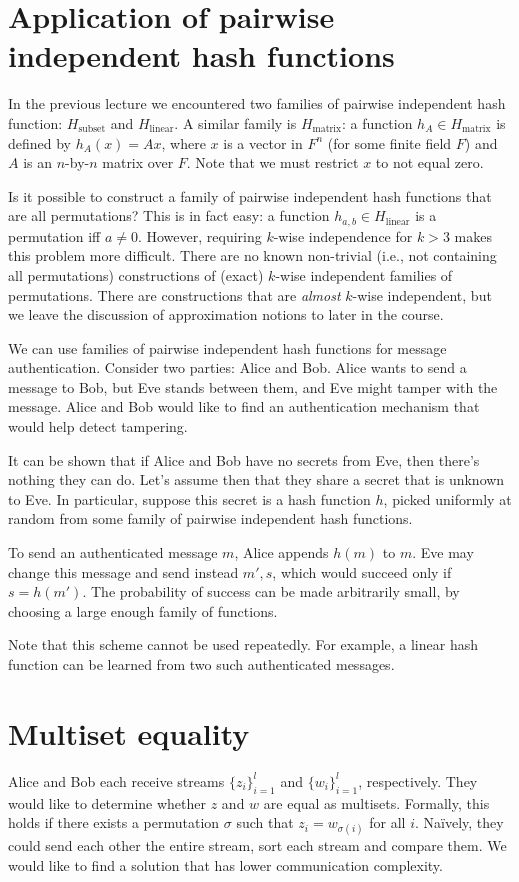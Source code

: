 \documentclass{article}
\begin{document}
\section{Application of pairwise independent hash functions}
In the previous lecture we encountered two families of pairwise
independent hash function: $H_{\mathrm{subset}}$ and
$H_{\mathrm{linear}}$. A similar family is $H_{\mathrm{matrix}}$: a
function $h_A \in H_{\mathrm{matrix}}$ is defined by $h_A(x) = Ax$,
where $x$ is a vector in $F^n$ (for some finite field $F$) and
$A$ is an $n$-by-$n$ matrix over $F$. Note that we must restrict $x$
to not equal zero.

Is it possible to construct a family of pairwise independent hash
functions that are all permutations? This is in fact easy: a function
$h_{a,b} \in H_{\mathrm{linear}}$ is a permutation iff $a \neq 0$.
However, requiring $k$-wise independence for $k>3$ makes this problem
more difficult. There are no known non-trivial (i.e., not containing
all permutations) constructions of (exact) $k$-wise independent
families of permutations.  There are constructions that are {\em
  almost} $k$-wise independent, but we leave the discussion of
approximation notions to later in the course.

We can use families of pairwise independent hash functions for message
authentication. Consider two parties: Alice and Bob. Alice wants to
send a message to Bob, but Eve stands between them, and Eve might
tamper with the message. Alice and Bob would like to find an
authentication mechanism that would help detect tampering.

It can be shown that if Alice and Bob have no secrets from Eve, then
there's nothing they can do. Let's assume then that they share a
secret that is unknown to Eve. In particular, suppose this secret is a
hash function $h$, picked uniformly at random from some family of
pairwise independent hash functions.

To send an authenticated message $m$, Alice appends $h(m)$ to $m$. Eve
may change this message and send instead $m',s$, which would succeed
only if $s=h(m')$. The probability of success can be made arbitrarily
small, by choosing a large enough family of functions.

Note that this scheme cannot be used repeatedly. For example, a linear
hash function can be learned from two such authenticated messages.

\section{Multiset equality}
Alice and Bob each receive streams $\{z_i\}_{i=1}^l$ and
$\{w_i\}_{i=1}^l$, respectively. They would like to determine whether
$z$ and $w$ are equal as multisets. Formally, this holds if there
exists a permutation $\sigma$ such that $z_i=w_{\sigma(i)}$ for all
$i$. Na\"ively, they could send each other the entire stream, sort
each stream and compare them. We would like to find a solution that
has lower communication complexity.
\end{document}
